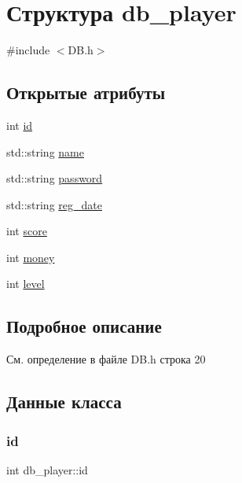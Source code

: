 \hypertarget{structdb__player}{}\section{Структура db\+\_\+player}
\label{structdb__player}


{\ttfamily \#include $<$D\+B.\+h$>$}

\subsection*{Открытые атрибуты}
\begin{DoxyCompactItemize}
\item 
int \mbox{\hyperlink{structdb__player_adae59dcd7ab22b0e66cb829f1dc5b383}{id}}
\item 
std\+::string \mbox{\hyperlink{structdb__player_a182fb42d16b91d5dccc9c640bc649521}{name}}
\item 
std\+::string \mbox{\hyperlink{structdb__player_a44fb2105fb4d116447eee76a5494821d}{password}}
\item 
std\+::string \mbox{\hyperlink{structdb__player_abef0de717f781b401effd7d3c35550c2}{reg\+\_\+date}}
\item 
int \mbox{\hyperlink{structdb__player_a49a7074936df50c10ce3573663e902bc}{score}}
\item 
int \mbox{\hyperlink{structdb__player_a11f7c74a3d7b7f6c91f5ac6823c848af}{money}}
\item 
int \mbox{\hyperlink{structdb__player_a87ec3fa495482d1018974f2694430156}{level}}
\end{DoxyCompactItemize}


\subsection{Подробное описание}


См. определение в файле D\+B.\+h строка 20



\subsection{Данные класса}
\mbox{\label{structdb__player_adae59dcd7ab22b0e66cb829f1dc5b383}} 
\subsubsection{\texorpdfstring{id}{id}}
{\footnotesize\ttfamily int db\+\_\+player\+::id}



